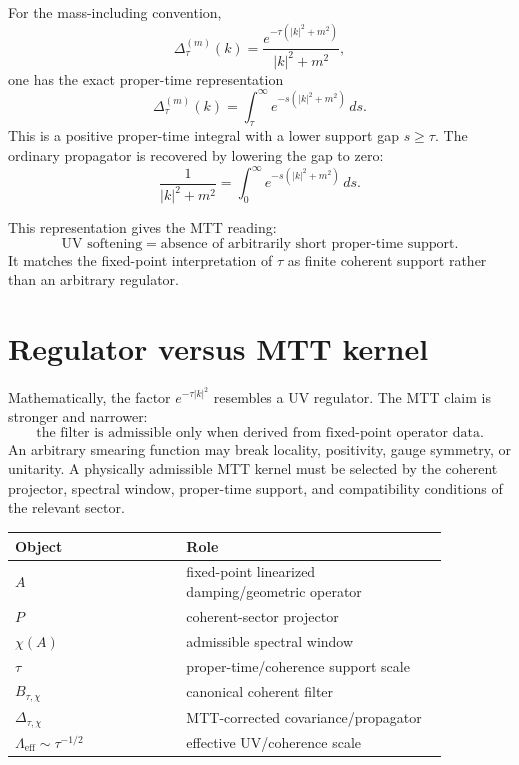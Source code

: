 \documentclass[11pt]{article}
\begin{document}
For the mass-including convention,
\[
        \Delta_\tau^{(m)}(k)
        =
        \frac{e^{-\tau(|k|^2+m^2)}}{|k|^2+m^2},
\]
one has the exact proper-time representation
\[
        \Delta_\tau^{(m)}(k)
        =
        \int_{\tau}^{\infty} e^{-s(|k|^2+m^2)}\,ds .
\]
This is a positive proper-time integral with a lower support gap \(s\ge\tau\). The ordinary propagator is recovered by lowering the gap to zero:
\[
        \frac{1}{|k|^2+m^2}
        =
        \int_{0}^{\infty} e^{-s(|k|^2+m^2)}\,ds.
\]

This representation gives the MTT reading:
\[
        \boxed{\text{UV softening}=\text{absence of arbitrarily short proper-time support}.}
\]
It matches the fixed-point interpretation of \(\tau\) as finite coherent support rather than an arbitrary regulator.

\section{Regulator versus MTT kernel}

Mathematically, the factor \(e^{-\tau |k|^2}\) resembles a UV regulator. The MTT claim is stronger and narrower:
\[
        \boxed{
        \text{the filter is admissible only when derived from fixed-point operator data.}
        }
\]
An arbitrary smearing function may break locality, positivity, gauge symmetry, or unitarity. A physically admissible MTT kernel must be selected by the coherent projector, spectral window, proper-time support, and compatibility conditions of the relevant sector.

\begin{center}
\begin{tabular}{p{0.34\linewidth}p{0.52\linewidth}}
\toprule
Object & Role \\
\midrule
\(A\) & fixed-point linearized damping/geometric operator \\
\(P\) & coherent-sector projector \\
\(\chi(A)\) & admissible spectral window \\
\(\tau\) & proper-time/coherence support scale \\
\(B_{\tau,\chi}\) & canonical coherent filter \\
\(\Delta_{\tau,\chi}\) & MTT-corrected covariance/propagator \\
\(\Lambda_{\mathrm{eff}}\sim\tau^{-1/2}\) & effective UV/coherence scale \\
\bottomrule
\end{tabular}
\end{center}
\end{document}
